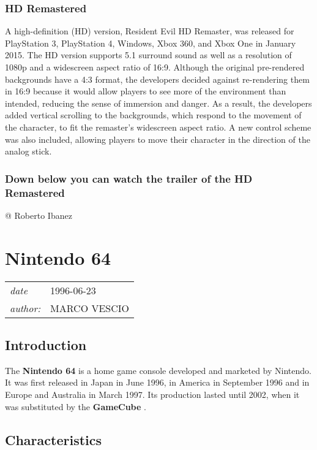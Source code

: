 \documentclass[a4paper,10pt]{book}
\newcommand{\pageHeader}[4]{
    \section{#1}
    \vspace{-0.3cm}
    \begin{table}[h!]
     \begin{tabular}{ll}
        \hline
        \textit{date} & #2 \\
        \textit{author: } & #3\\
        \hline
     \end{tabular}
    \end{table}
    \vspace{-0.3cm}
}
\begin{document}
 \subsubsection{HD Remastered }
 
            A high-definition (HD) version, Resident Evil HD Remaster, was released for PlayStation 3, PlayStation 4, Windows, Xbox 360, and Xbox One in January 2015. 
            The HD version supports 5.1 surround sound as well as a resolution of 1080p and a widescreen aspect ratio of 16:9. 
            Although the original pre-rendered backgrounds have a 4:3 format, the developers decided against re-rendering them in 16:9 because it would allow players to see more of the environment than intended, reducing the sense of immersion and danger. 
            As a result, the developers added vertical scrolling to the backgrounds, which respond to the movement of the character, to fit the remaster's widescreen aspect ratio. 
            A new control scheme was also included, allowing players to move their character in the direction of the analog stick.
         
 \subsubsection{ Down below you can watch the trailer of the HD Remastered }
 
 
 
 @ Roberto Ibanez 
 
 \newpage\pageHeader{Nintendo 64}{1996-06-23}{MARCO VESCIO}{A webpage on Nintendo 64}
 \subsection{Introduction }
 
          The  \textbf{Nintendo 64 }  is a home game console developed and marketed by Nintendo. 
          It was first released in Japan in June 1996, in America in September 1996 and in Europe
          and Australia in March 1997. Its production lasted until 2002, when it was substituted by the  \textbf{GameCube } .
         
 \subsection{Characteristics }
 
\end{document}
